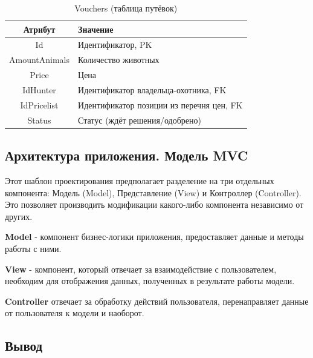 	\begin{table}[pt!] 
		\begin{center}
			\caption{Vouchers (таблица путёвок)}
			\label{vouchers_table}
			\begin{tabular}{| c | l |}
				\hline
				\textbf{Атрибут} 	& \textbf{Значение} \\
				\hline
				Id 					&	Идентификатор, PK\\
				\hline
				AmountAnimals		& 	Количество животных \\
				\hline
				Price	 			&	Цена \\ 
				\hline
				IdHunter	 		&	Идентификатор владельца-охотника, FK \\ 
				\hline
				IdPricelist	 		&	Идентификатор позиции из перечня цен, FK \\
				\hline
				Status				& 	Статус (ждёт решения/одобрено) \\
				\hline
			\end{tabular}
		\end{center}
	\end{table}

	\subsection{Архитектура приложения. Модель MVC}
	Этот шаблон проектирования предполагает разделение на три отдельных компонента: Модель (Model), Представление (View) и Контроллер (Controller). Это позволяет производить модификации какого-либо компонента независимо от других. \cite{mvc} 
	
	\textbf{Model} - компонент бизнес-логики приложения, предоставляет данные и методы работы с ними.
	
	\textbf{View} - компонент, который отвечает за взаимодействие с пользователем, необходим для отображения данных, полученных в результате работы модели.
	
	\textbf{Controller} отвечает за обработку действий пользователя, перенаправляет данные от пользователя к модели и наоборот.\\
	
	\subsection{Вывод}




	
	